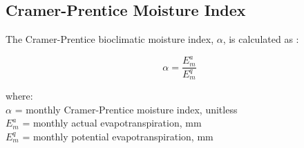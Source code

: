 \subsection{Cramer-Prentice Moisture Index}
\label{sec:alpha}
The Cramer-Prentice bioclimatic moisture index, $\alpha$, is calculated as \parencite[as described in][]{sykes96, gallego-sala10}:

\begin{equation}
\label{eq:alpha}
	\alpha = \frac{E^a_m}{E^q_m}
\end{equation}

\noindent where:\\
\indent $\alpha$ = monthly Cramer-Prentice moisture index, unitless \\
\indent $E^a_m$ = monthly actual evapotranspiration, mm\\
\indent $E^q_m$ = monthly potential evapotranspiration, mm\\

